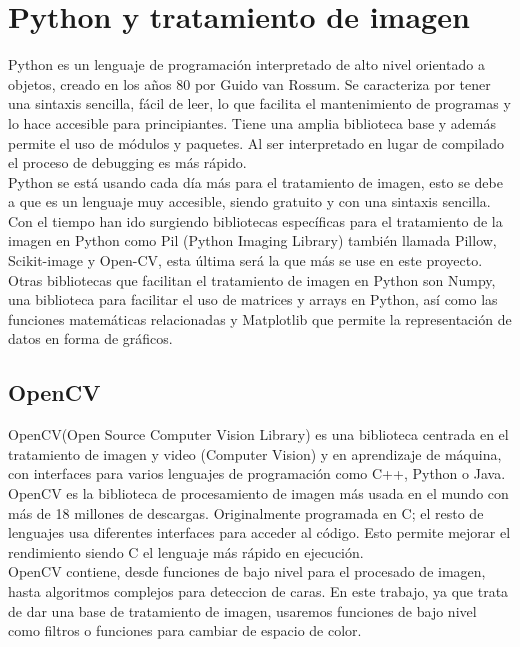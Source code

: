 \documentclass[a4paper,12pt]{report}
\begin{document}
\section{Python y tratamiento de imagen}

Python es un lenguaje de programación interpretado de alto nivel orientado a objetos, creado en los años 80 por Guido van Rossum. Se caracteriza por tener una sintaxis sencilla, fácil de leer, lo que facilita el mantenimiento de programas y lo hace accesible para principiantes. Tiene una amplia biblioteca base y además permite el uso de módulos y paquetes. Al ser interpretado en lugar de compilado el proceso de debugging es más rápido.\\

 Python se está usando cada día más para el tratamiento de imagen, esto se debe a que es un lenguaje muy accesible, siendo gratuito y con una sintaxis sencilla. Con el tiempo han ido surgiendo bibliotecas específicas para el tratamiento de la imagen en Python como Pil (Python Imaging Library) también llamada Pillow, Scikit-image y Open-CV, esta última será la que más se use en este proyecto.\\

Otras bibliotecas que facilitan el tratamiento de imagen en Python son Numpy, una biblioteca para facilitar el uso de matrices y arrays en Python, así como las funciones matemáticas relacionadas y Matplotlib que permite  la representación de datos en forma de gráficos.

\subsection{OpenCV}

OpenCV(Open Source Computer Vision Library) es una biblioteca centrada en el tratamiento de imagen y video (Computer Vision) y en aprendizaje de máquina, con interfaces para varios lenguajes de programación como C++, Python o Java. OpenCV es la biblioteca de procesamiento de imagen más usada en el mundo con más de 18 millones de descargas. Originalmente programada en C; el resto de lenguajes usa diferentes interfaces para acceder al código. Esto permite mejorar el rendimiento siendo C el lenguaje más rápido en ejecución.\\

OpenCV contiene,  desde funciones de bajo nivel para el procesado de imagen, hasta algoritmos complejos para deteccion de caras. En este trabajo, ya que trata de dar una base de tratamiento de imagen, usaremos funciones de bajo nivel como filtros o funciones para cambiar de espacio de color.\\
\end{document}
